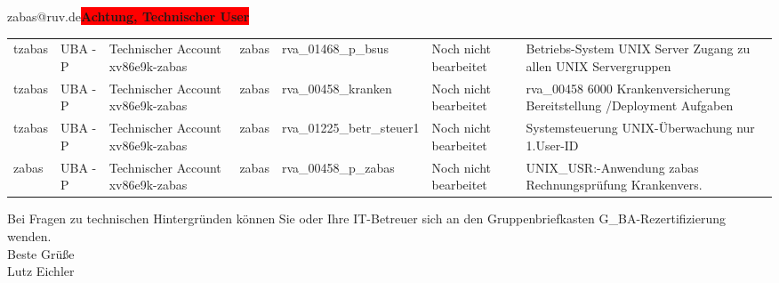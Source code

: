 \documentclass[a4paper,landscape,12pt]{letter}
\begin{document}
\begin{letter}{zabas@ruv.de\space\space\space\space\space\space\space\space\space\bfseries\colorbox{red}{Achtung, Technischer User}\hfill \break}
\begin{tiny}
\begin{longtable}{|p{35mm}|p{15mm}|p{25mm}|p{10mm}|p{40mm}|p{50mm}|p{50mm}|}
tzabas & UBA - P & Technischer Account xv86e9k-zabas & zabas & rva\_01468\_p\_bsus & Noch nicht bearbeitet & Betriebs-System UNIX Server Zugang zu allen UNIX Servergruppen \\
tzabas & UBA - P & Technischer Account xv86e9k-zabas & zabas & rva\_00458\_kranken & Noch nicht bearbeitet & rva\_00458 6000 Krankenversicherung Bereitstellung /Deployment Aufgaben \\
tzabas & UBA - P & Technischer Account xv86e9k-zabas & zabas & rva\_01225\_betr\_steuer1 & Noch nicht bearbeitet & Systemsteuerung UNIX-Überwachung nur 1.User-ID \\
zabas & UBA - P & Technischer Account xv86e9k-zabas & zabas & rva\_00458\_p\_zabas & Noch nicht bearbeitet & UNIX\_USR:-Anwendung zabas Rechnungsprüfung Krankenvers. \\

\hline
		\end{longtable}
		\end{tiny}
	
\begin{minipage}{\textwidth}
			Bei Fragen zu technischen Hintergründen können Sie 
			oder Ihre IT-Betreuer sich an den Gruppenbriefkasten 
			G\_BA-Rezertifizierung
			wenden.\\
			\linebreak
			Beste Grüße\\
			Lutz Eichler
	\end{minipage}
	\end{letter}
	
\end{document}
